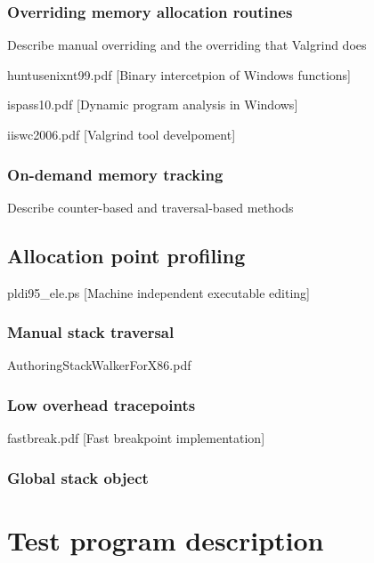 \subsubsection{Overriding memory allocation routines}
\label{subsubsection:overridingroutines}

Describe manual overriding and the overriding that Valgrind does

huntusenixnt99.pdf [Binary intercetpion of Windows functions]

ispass10.pdf [Dynamic program analysis in Windows]

iiswc2006.pdf [Valgrind tool develpoment]

\subsubsection{On-demand memory tracking}
\label{subsubsection:ondemandtracking}

Describe counter-based and traversal-based methods

\subsection{Allocation point profiling}
\label{subsection:allocationpointprofiling}

pldi95\_ele.ps [Machine independent executable editing]

\subsubsection{Manual stack traversal}
\label{subsubsection:manualstacktraversal}

AuthoringStackWalkerForX86.pdf

\subsubsection{Low overhead tracepoints}
\label{subsubsection:lowoverheadtracepoints}

fastbreak.pdf [Fast breakpoint implementation]

\subsubsection{Global stack object}
\label{subsubsection:globalstackobject}

\section{Test program description}
\label{section:testprogram}
